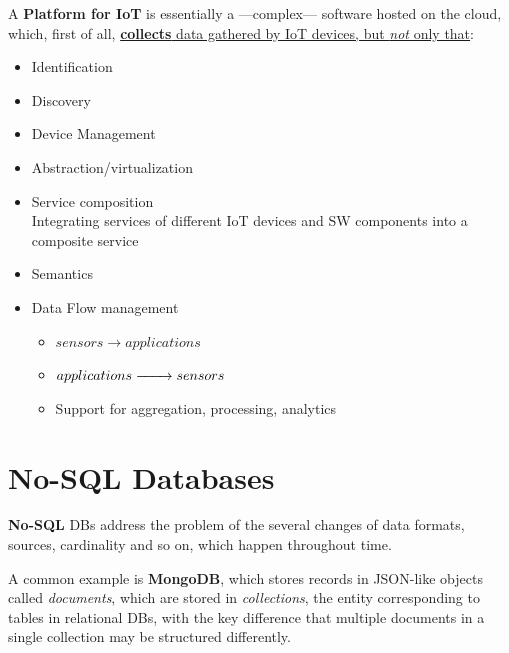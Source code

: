 A \textbf{Platform for IoT} is essentially a ---complex--- software hosted on the cloud, which, first of all, \ul{\textbf{collects} data gathered by IoT devices, but \textit{not} only that}:
\begin{itemize}
   \item Identification
   \item Discovery
   \item Device Management
   \item Abstraction/virtualization
   \item Service composition\\
   Integrating services of different IoT devices and SW components into a composite service
   \item Semantics
   \item Data Flow management
   \begin{itemize}
      \item $sensors \longrightarrow applications$
      \item $applications \xrightarrow{\hspace*{2em}} sensors$
      \item Support for aggregation, processing, analytics
   \end{itemize}
\end{itemize}

\section{No-SQL Databases}
\textbf{No-SQL} DBs address the problem of the several changes of data formats, sources, cardinality and so on, which happen throughout time.

A common example is \textbf{MongoDB}, which stores records in JSON-like objects called \textit{documents}, which are stored in \textit{collections}, the entity corresponding to tables in relational DBs,
with the key difference that multiple documents in a single collection may be structured differently.

